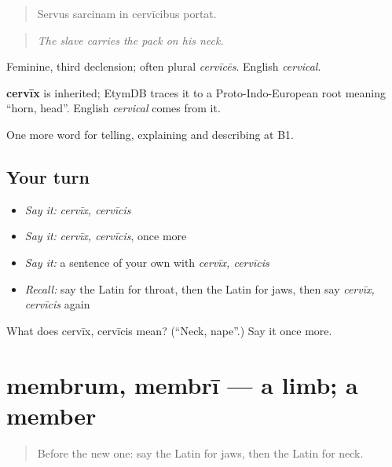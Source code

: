 \begin{quote}
Servus sarcinam in cervīcibus portat.
\end{quote}

\begin{quote}
\emph{The slave carries the pack on his neck.}
\end{quote}

Feminine, third declension; often plural \emph{cervīcēs}. English \emph{cervical}.

\begin{cousinweb}
\textbf{cervīx} is inherited; EtymDB traces it to a Proto-Indo-European root meaning \textquotedblleft{}horn, head\textquotedblright{}. English \emph{cervical} comes from it.
\end{cousinweb}

\begin{grammarlens}[title={What you've built}]
One more word for telling, explaining and describing at B1.
\end{grammarlens}

\subsection*{Your turn}
\begin{itemize}
\raggedright
  \item \emph{Say it:} \emph{cervīx, cervīcis}
  \item \emph{Say it:} \emph{cervīx, cervīcis}, once more
  \item \emph{Say it:} a sentence of your own with \emph{cervīx, cervīcis}
  \item \emph{Recall:} say the Latin for throat, then the Latin for jaws, then say \emph{cervīx, cervīcis} again
\end{itemize}

\begin{tcolorbox}[breakable,colback=teal!4,colframe=teal!35!black,title={Before you move on}]
What does cervīx, cervīcis mean? (\textquotedblleft{}Neck, nape\textquotedblright{}.) Say it once more.
\end{tcolorbox}
\section[membrum, membrī]{membrum, membrī — a limb; a member}

\label{lesson:LA-C516-membrum}



\begin{quote}
Before the new one: say the Latin for jaws, then the Latin for neck.
\end{quote}


